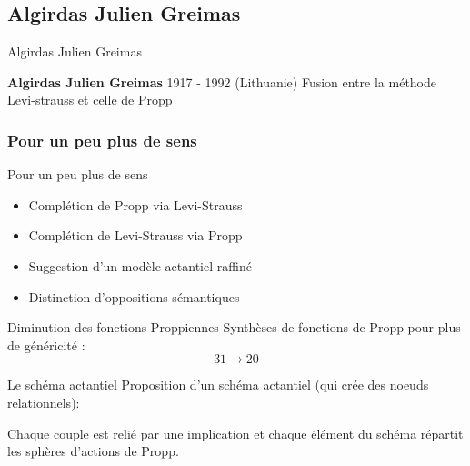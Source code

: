 \documentclass{beamer}
\begin{document}
\subsection{Algirdas Julien Greimas}
\begin{frame}{Algirdas Julien Greimas}
  \begin{block}{\textbf{Algirdas Julien Greimas} 1917 - 1992 (Lithuanie) }
    Fusion entre la méthode Levi-strauss et celle de Propp
  \end{block}
\end{frame}

\subsubsection{Pour un peu plus de sens}
\begin{frame}{Pour un peu plus de sens}
  \begin{itemize}
    \item Complétion de Propp via Levi-Strauss
    \item Complétion de Levi-Strauss via Propp
    \item Suggestion d'un modèle actantiel raffiné
    \item Distinction d'oppositions sémantiques
  \end{itemize}
\end{frame}

\begin{frame}{Diminution des fonctions Proppiennes}
  Synthèses de fonctions de Propp pour plus de généricité : 
$$31 \rightarrow 20$$
\end{frame}

\begin{frame}{Le schéma actantiel}
  Proposition d'un schéma actantiel (qui crée des noeuds relationnels):\newline
  \newline
  \begin{block}{}
    Chaque couple est relié par une implication et chaque élément du schéma répartit les sphères d'actions de Propp.
  \end{block}
\end{frame}
\end{document}
